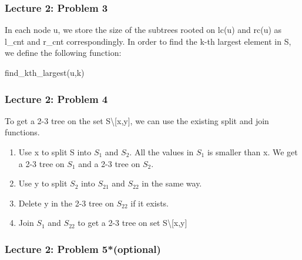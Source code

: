 \documentclass{beamer}
\begin{document}
\begin{frame}
	\frametitle{Lecture 2: Problem 3}
	In each node u, we store the size of the subtrees rooted on lc(u) and rc(u) as l\_cnt and r\_cnt correspondingly. In order to find the k-th largest element in S, we define the following function:
		\begin{algorithm}[H]
		\begin{algorithmic}[1]
			  \ENDIF
			  \ENDIF
			  \ENDIF
		\end{algorithmic}
		\caption{find\_kth\_largest(u,k)}
		
	\end{algorithm}
	
\end{frame}

\begin{frame}
	\frametitle{Lecture 2: Problem 4}
	To get a 2-3 tree on the set S\textbackslash [x,y], we can use the existing split and join functions. 
	\begin{enumerate}
		\item Use x to split S into $ S_1 $ and $ S_2$. All the values in $ S_1 $ is smaller than x. We get a 2-3 tree on $ S_1 $ and a 2-3 tree on $ S_2 $. 
		\item Use y to split $ S_2 $ into $ S_{21} $ and $ S_{22} $ in the same way. 
		\item Delete y in the 2-3 tree on $ S_{22} $ if it exists.
		\item Join $ S_1 $ and $ S_{22} $ to get a 2-3 tree on set S\textbackslash [x,y]
	\end{enumerate} 
	
	
\end{frame}

\begin{frame}
	\frametitle{Lecture 2: Problem 5*(optional)}
	
	
\end{frame}
\end{document}
